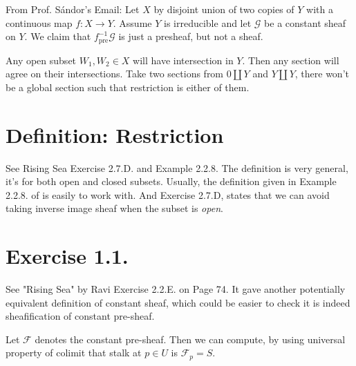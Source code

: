 From Prof. S\'andor's Email: Let $X$ by disjoint union of two copies of $Y$ with a continuous map $f:X\to Y$. Assume $Y$ is irreducible and let $\mathscr G$ be a constant sheaf on $Y$. We claim that $f^{-1}_{\text{pre}} \mathscr G$ is just a presheaf, but not a sheaf. 

Any open subset $W_1, W_2\in X$ will have intersection in $Y$. Then any section will agree on their intersections. Take two sections from $0\amalg Y$ and $Y\amalg Y$, there won't be a global section such that restriction is either of them.

\section{Definition: Restriction}

See Rising Sea \cite{RaviRisingSea} Exercise 2.7.D.  and Example 2.2.8. The definition is very general, it's for both open and closed subsets. Usually, the definition given in Example 2.2.8. of \cite{RaviRisingSea} is easily to work with. And Exercise 2.7.D, states that we can avoid taking inverse image sheaf when the subset is \textit{open}.

\section{Exercise 1.1.}

See "Rising Sea" by Ravi Exercise 2.2.E. on Page 74. It gave another potentially equivalent definition of constant sheaf, which could be easier to check it is indeed sheafification of constant pre-sheaf.

Let $\mathscr F$ denotes the constant pre-sheaf. Then we can compute, by using universal property of colimit that stalk at $p\in U$ is $\mathscr F_p=S$. 

